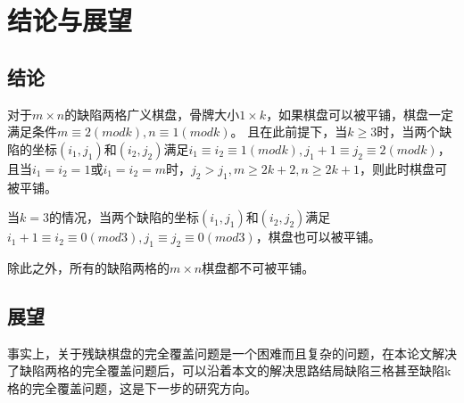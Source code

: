 \chapter{结论与展望}
\section{结论}
对于$m \times n$的缺陷两格广义棋盘，骨牌大小$1 \times k$，如果棋盘可以被平铺，棋盘一定满足条件$m \equiv 2 (mod k), n \equiv 1 (mod k)$。
且在此前提下，当$k \ge 3$时，当两个缺陷的坐标$(i_1, j_1)$和$(i_2, j_2)$满足$i_1 \equiv i_2 \equiv 1 (mod k), j_1 + 1 \equiv j_2 \equiv 2 (mod k)$，
且当$i_1 = i_2 = 1$或$i_1 = i_2 = m$时，$j_2 > j_1, m \ge 2k + 2, n \ge 2k + 1$，则此时棋盘可被平铺。

当$k = 3$的情况，当两个缺陷的坐标$(i_1, j_1)$和$(i_2, j_2)$满足$i_1 + 1\equiv i_2 \equiv 0 (mod 3), j_1 \equiv j_2 \equiv 0 (mod 3)$，棋盘也可以被平铺。

除此之外，所有的缺陷两格的$m \times n$棋盘都不可被平铺。

\section{展望}
事实上，关于残缺棋盘的完全覆盖问题是一个困难而且复杂的问题，在本论文解决了缺陷两格的完全覆盖问题后，可以沿着本文的解决思路结局缺陷三格甚至缺陷k格的完全覆盖问题，这是下一步的研究方向。
